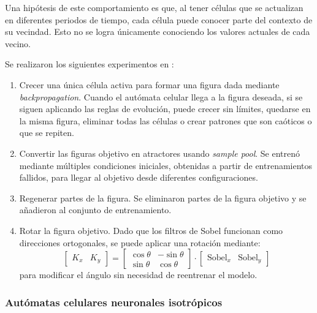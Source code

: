 Una hipótesis de este comportamiento es que, al tener células que se actualizan en diferentes periodos de tiempo, cada célula puede conocer parte del contexto de su vecindad. Esto no se logra únicamente conociendo los valores actuales de cada vecino.

Se realizaron los siguientes experimentos en \cite{mordvintsev2020_nca}:

\begin{enumerate}
	
	\item Crecer una única célula activa para formar una figura dada mediante \textit{backpropagation}. Cuando el autómata celular llega a la figura deseada, si se siguen aplicando las reglas de evolución, puede crecer sin límites, quedarse en la misma figura, eliminar todas las células o crear patrones que son caóticos o que se repiten.
	
	
	
	\item Convertir las figuras objetivo en atractores usando \textit{sample pool}. Se entrenó mediante múltiples condiciones iniciales, obtenidas a partir de entrenamientos fallidos, para llegar al objetivo desde diferentes configuraciones. 
	
	
	
	\item Regenerar partes de la figura. Se eliminaron partes de la figura objetivo y se añadieron al conjunto de entrenamiento.
	
	
	
	\item Rotar la figura objetivo. Dado que los filtros de Sobel funcionan como direcciones ortogonales, se puede aplicar una rotación mediante: 
	\[ \begin{bmatrix}
		K_x & K_y
	\end{bmatrix} = \begin{bmatrix}
		\cos \theta & -\sin \theta \\
		\sin \theta & \cos \theta
	\end{bmatrix} \cdot \begin{bmatrix}
		\text{Sobel}_x & \text{Sobel}_y
	\end{bmatrix} \]
	para modificar el ángulo sin necesidad de reentrenar el modelo.
	
\end{enumerate}

\subsubsection{Autómatas celulares neuronales isotrópicos}

